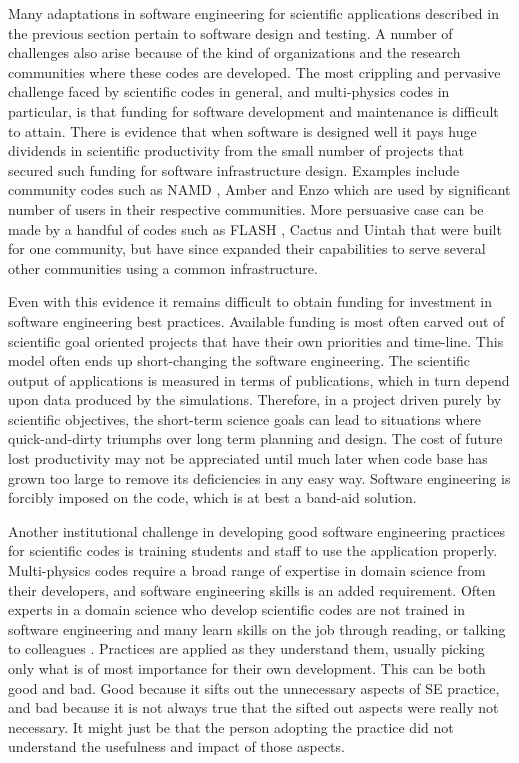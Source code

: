 \label{sec:institutional-challenges}
Many adaptations in software engineering for scientific applications
described in the previous section pertain to software design and
testing. A number of challenges also arise because of the kind of
organizations and the research communities where these codes are
developed. The most crippling and pervasive 
challenge faced by scientific codes in general, and multi-physics codes in
particular, is that funding for software development and maintenance is difficult to attain. 
There is evidence that when software is designed well
it pays huge dividends in scientific productivity from the
small number of projects that secured such funding for software
infrastructure design. Examples include community codes such as NAMD
\cite{phillips2005scalable}, Amber \cite{case2014amber} and Enzo \cite{Enzo2013} which are used by
significant number of users in their respective communities. More
persuasive case can be made by a handful of codes such as FLASH \cite{Dubey2009, Dubey2008},
Cactus \cite{blazewiczphysics} and Uintah \cite{TGRID10,uintah2} that were built for one community,
but have since expanded their capabilities to serve several other
communities using a common infrastructure.

Even with this evidence it remains difficult to obtain
funding for investment in software engineering best practices.
Available funding is most often carved out of scientific goal 
oriented projects that have their own priorities and time-line. This
model often ends up short-changing the software engineering.
The scientific output of applications is measured in terms of publications, which in
turn depend upon data produced by the simulations. Therefore, in a
project driven purely by scientific objectives, the short-term science
goals can lead to situations where quick-and-dirty triumphs over
long term planning and design. The cost of future lost productivity
may not be appreciated until much later when code base has  grown too
large to remove its deficiencies in any easy way.  Software
engineering is forcibly imposed on the code, which is at best a
band-aid solution. 

Another institutional challenge in developing good software
engineering practices for scientific codes is training students and staff to
use the application properly. Multi-physics codes require a broad range
of expertise in domain science from their developers, and software
engineering skills is an added requirement.  Often experts in a domain
science who develop scientific codes are not trained in software engineering
and many learn skills on the job through reading, or talking to
colleagues \cite{hannay2009,Nguyen-Hoan}. Practices are applied as they understand them, usually
picking only what is of most importance for their own development.
This can be both good and bad. Good because it sifts out the unnecessary aspects of SE
practice, and bad because it is not always true that the sifted out
aspects were really not necessary. It might just be that the person
adopting the practice did not understand the usefulness and impact of
those aspects.

